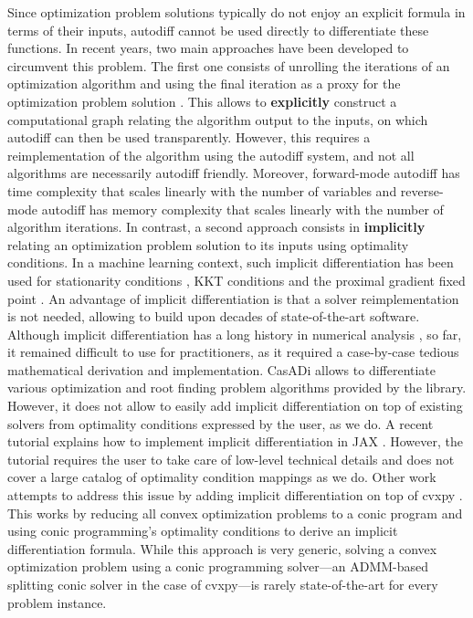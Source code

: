 \documentclass{article}
\begin{document}
Since optimization problem solutions typically do not enjoy an explicit formula
in terms of their inputs, autodiff cannot be used directly to differentiate
these functions.  In recent years, two main approaches have been developed to
circumvent this problem. The first one consists of unrolling the iterations of
an optimization algorithm and using the final iteration as a proxy for the
optimization problem solution \cite{wengert_1964, domke_2012, deledalle_2014,
franceschi_2018, ablin_2020}. 
This allows to \textbf{explicitly} construct a computational graph relating the
algorithm output to the inputs, on which autodiff can then be used
transparently.  
However, this
requires a reimplementation of the algorithm using the autodiff system, and not
all algorithms are necessarily autodiff friendly.
Moreover, forward-mode autodiff has time complexity that scales linearly with
the number of variables and reverse-mode autodiff has memory complexity
that scales linearly with the number of algorithm iterations.
In contrast, a second approach consists in \textbf{implicitly} relating
an optimization problem solution to its inputs using optimality conditions. 
In a machine learning context, such implicit differentiation has been used for
stationarity conditions \cite{bengio_2000,lorraine_2020}, KKT conditions
\cite{chapelle_2002, gould_2016, amos_2017,sparsemap,lp_sparsemap} and the
proximal gradient fixed point
\cite{niculae_2017,bertrand_2020_implicit,bertrand_2021_journal}. An advantage
of implicit differentiation is that a solver reimplementation is not needed,
allowing to build upon decades of state-of-the-art software.
Although implicit differentiation has a long history in numerical analysis
\cite{griewank_2008,bell_2008,krantz_2012,bonnans_2013}, so far, it remained
difficult to use for practitioners, as it required
a case-by-case tedious mathematical derivation and implementation. 
CasADi \cite{casadi} allows to differentiate various optimization and root
finding problem algorithms provided by the library. However, it does not allow
to easily add implicit differentiation on top of existing solvers from
optimality conditions expressed by the user, as we do.
A recent tutorial explains how to implement implicit differentiation in JAX
\cite{tutorial_implicit}.  However, the tutorial requires the user to take
care of low-level technical details and does not cover a large catalog of
optimality condition mappings as we do.
Other work \cite{agrawal_2019}
attempts to address this issue by adding implicit differentiation on top of
cvxpy \cite{cvxpy}. This works by reducing all convex optimization problems to a
conic program and using conic
programming's optimality conditions to derive an implicit differentiation
formula.
While this approach is very generic, solving a convex optimization problem
using a conic programming solver---an ADMM-based splitting conic solver
\cite{splitting_conic} in the case of cvxpy---is rarely state-of-the-art
for every problem instance. 
\end{document}
